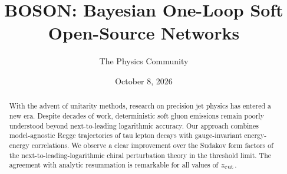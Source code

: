 \documentclass[11pt]{article}
\title{BOSON: Bayesian One-Loop Soft Open-Source Networks}
\author{The Physics Community}
\date{October 8, 2026}
\begin{document}
\maketitle
\begin{abstract}
With the advent of unitarity methods, research on precision jet physics
has entered a new era. Despite decades of work, deterministic soft gluon
emissions remain poorly understood beyond next-to-leading logarithmic
accuracy. Our approach combines model-agnostic Regge trajectories of tau
lepton decays with gauge-invariant energy-energy correlations. We
observe a clear improvement over the Sudakov form factors of the
next-to-leading-logarithmic chiral perturbation theory in the threshold
limit. The agreement with analytic resummation is remarkable for all
values of $z_{\rm cut}$.
\end{abstract}
\tableofcontents





\nocite{*}


\end{document}
